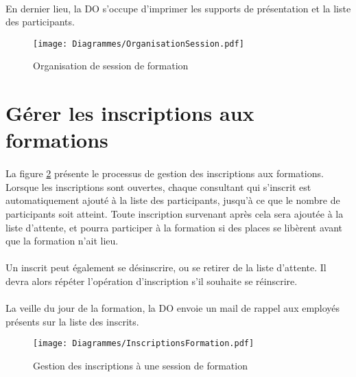 \paragraph{} En dernier lieu, la DO s'occupe d'imprimer les supports de présentation et la liste des participants.
\begin{figure}[H]
	\centering
\begin{sideways}
	\texttt{[image: Diagrammes/OrganisationSession.pdf]}
\end{sideways}
	\caption{Organisation de session de formation} 
	\label{orgaForm}
\end{figure}




\section{Gérer les inscriptions aux formations}
\label{sec:inscriptions}
\paragraph{} La figure \ref{inscriptionForm} présente le processus de gestion des inscriptions aux formations. Lorsque les inscriptions sont ouvertes, chaque consultant qui s'inscrit est automatiquement ajouté à la liste des participants, jusqu'à ce que le nombre de participants soit atteint. Toute inscription survenant après cela sera ajoutée à la liste d'attente, et pourra participer à la formation si des places se libèrent avant que la formation n'ait lieu.
\paragraph{} Un inscrit peut également se désinscrire, ou se retirer de la liste d'attente. Il devra alors répéter l'opération d'inscription s'il souhaite se réinscrire.
\paragraph{} La veille du jour de la formation, la DO envoie un mail de rappel aux employés présents sur la liste des inscrits. 


\begin{figure}[H]
\centering
\begin{sideways}
	\texttt{[image: Diagrammes/InscriptionsFormation.pdf]}
\end{sideways}
	\caption{Gestion des inscriptions à une session de formation}
	\label{inscriptionForm}
\end{figure}


